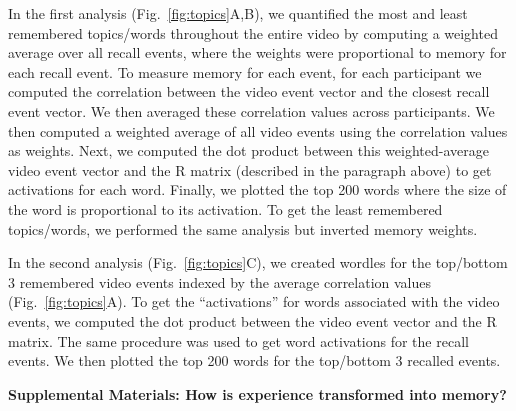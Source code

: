 \documentclass{article}
\begin{document}
In the first analysis (Fig.~\ref{fig:topics}A,B), we quantified the most and least remembered topics/words throughout the entire video by computing a weighted average over all recall events, where the weights were proportional to memory for each recall event. To measure memory for each event, for each participant we computed the correlation between the video event vector and the closest recall event vector. We then averaged these correlation values across participants. We then computed a weighted average of all video events using the correlation values as weights. Next, we computed the dot product between this weighted-average video event vector and the R matrix (described in the paragraph above) to get activations for each word. Finally, we plotted the top 200 words where the size of the word is proportional to its activation. To get the least remembered topics/words, we performed the same analysis but inverted memory weights.

In the second analysis (Fig.~\ref{fig:topics}C), we created wordles for the top/bottom 3 remembered video events indexed by the average correlation values (Fig.~\ref{fig:topics}A).  To get the ``activations'' for words associated with the video events, we computed the dot product between the video event vector and the R matrix. The same procedure was used to get word activations for the recall events. We then plotted the top 200 words for the top/bottom 3 recalled events.


\pagebreak
\begin{center}
\textbf{\large Supplemental Materials: How is experience transformed into memory?}
\end{center}
\setcounter{equation}{0}
\setcounter{figure}{0}
\setcounter{table}{0}
\setcounter{page}{1}
\setcounter{section}{0}
\makeatletter
\renewcommand{\theequation}{S\arabic{equation}}
\renewcommand{\thefigure}{S\arabic{figure}}
\renewcommand{\bibnumfmt}[1]{[S#1]}
\renewcommand{\citenumfont}[1]{S#1}
\end{document}
